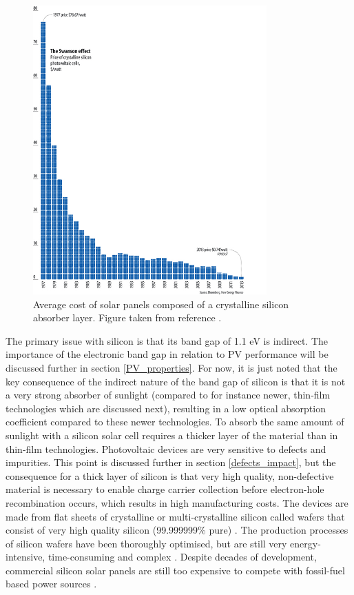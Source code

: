 \documentclass[11pt, twoside]{report}
\begin{document}
\begin{figure}[h!]
  \centering
    \includegraphics[width=0.8\textwidth]{figures/Si_cost.jpg}
    \caption[Average cost of solar panels composed of a crystalline silicon absorber layer.]{Average cost of solar panels composed of a crystalline silicon absorber layer. Figure taken from reference .}
  \label{Si_cost}
\end{figure}

The primary issue with silicon is that its band gap of 1.1 eV is indirect. The importance of the electronic band gap in relation to PV performance will be discussed further in section \ref{PV_properties}. For now, it is just noted that the key consequence of the indirect nature of the band gap of silicon is that it is not a very strong absorber of sunlight (compared to for instance newer, thin-film technologies which are discussed next), resulting in a low optical absorption coefficient  compared to these newer technologies. To absorb the same amount of sunlight with a silicon solar cell requires a thicker layer of the material than in thin-film technologies. Photovoltaic devices are very sensitive to defects and impurities. This point is discussed further in section \ref{defects_impact}, but the consequence for a thick layer of silicon is that very high quality, non-defective material is necessary to enable charge carrier collection before electron-hole recombination occurs, which results in high manufacturing costs. The devices are made from flat sheets of crystalline or multi-crystalline silicon called wafers that consist of very high quality silicon (99.999999\% pure) 
\cite{sus_book_5}.
The production processes of silicon wafers have been thoroughly optimised, but are still very energy-intensive, time-consuming and complex \cite{emerging_pv}.
Despite decades of development, commercial silicon solar panels are still too expensive to compete with fossil-fuel based power sources \cite{FE_PV_rev1_5}. 
\end{document}
